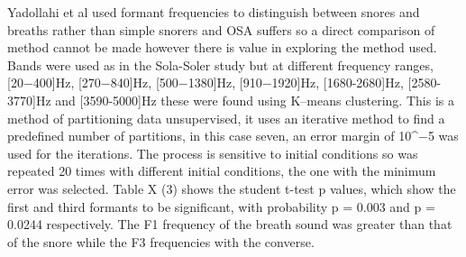 Yadollahi et al used formant frequencies to distinguish between snores and breaths rather than simple snorers and OSA suffers so a direct comparison of method cannot be made however there is value in exploring the method used. Bands were used as in the Sola-Soler study but at different frequency ranges, [20−400]Hz, [270−840]Hz, [500−1380]Hz, [910−1920]Hz, [1680-2680]Hz, [2580-3770]Hz and [3590-5000]Hz these were found using K–means clustering. This is a method of partitioning data unsupervised, it uses an iterative method to find a predefined number of partitions, in this case seven, an error margin of 10^−5 was used for the iterations. The process is sensitive to initial conditions so was repeated 20 times with different initial conditions, the one with the minimum error was selected. Table X (3) shows the student t-test p values, which show the first and third formants to be significant, with probability p = 0.003 and p = 0.0244 respectively. The F1 frequency of the breath sound was greater than that of the snore while the F3 frequencies with the converse. 


